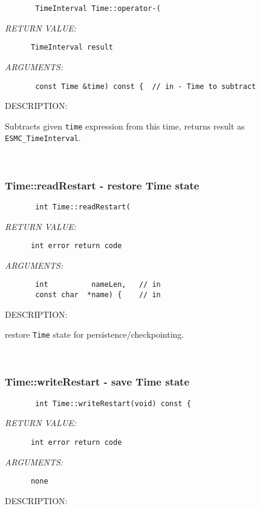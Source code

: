   
\begin{verbatim}       TimeInterval Time::operator-(\end{verbatim}{\em RETURN VALUE:}
\begin{verbatim}      TimeInterval result\end{verbatim}{\em ARGUMENTS:}
\begin{verbatim}       const Time &time) const {  // in - Time to subtract\end{verbatim}
{\sf DESCRIPTION:\\ }


      Subtracts given {\tt time} expression from this time, returns
      result as {\tt ESMC\_TimeInterval}.
   
 
\mbox{}\hrulefill\ 
 
\subsubsection [Time::readRestart] {Time::readRestart - restore Time state}


  
\begin{verbatim}       int Time::readRestart(\end{verbatim}{\em RETURN VALUE:}
\begin{verbatim}      int error return code\end{verbatim}{\em ARGUMENTS:}
\begin{verbatim}       int          nameLen,   // in
       const char  *name) {    // in   \end{verbatim}
{\sf DESCRIPTION:\\ }


        restore {\tt Time} state for persistence/checkpointing.
   
 
\mbox{}\hrulefill\ 
 
\subsubsection [Time::writeRestart] {Time::writeRestart - save Time state}


  
\begin{verbatim}       int Time::writeRestart(void) const {\end{verbatim}{\em RETURN VALUE:}
\begin{verbatim}      int error return code\end{verbatim}{\em ARGUMENTS:}
\begin{verbatim}      none\end{verbatim}
{\sf DESCRIPTION:\\ }


